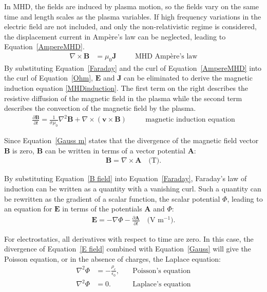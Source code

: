 In \ac{MHD}, the fields are induced by plasma motion, so the fields vary on the same time and length scales as the plasma variables. If high frequency variations in the electric field are not included, and only the non-relativistic regime is considered, the displacement current in Amp\`{e}re's law can be neglected, leading to Equation~\ref{AmpereMHD}.
\begin{align}
 \nabla\times\mathbf{B}&=\mu_0\mathbf{J}&&\quad\text{MHD Amp\`{e}re's law}
 \label{AmpereMHD}
\end{align}
\indent By substituting Equation~\ref{Faraday} and the curl of Equation~\ref{AmpereMHD} into the curl of Equation~\ref{Ohm}, $\mathbf{E}$ and $\mathbf{J}$ can be eliminated to derive the magnetic induction equation \eqref{MHDinduction}. The first term on the right describes the resistive diffusion of the magnetic field in the plasma while the second term describes the convection of the magnetic field by the plasma.
\begin{align}
 \frac{\partial\mathbf{B}}{\partial t}=\frac{1}{\sigma\mu_0}\nabla^2\mathbf{B}+\nabla\times\left(\mathbf{v}\times\mathbf{B}\right)&&\quad\text{magnetic induction equation}
 \label{MHDinduction}
\end{align}

Since Equation~\ref{Gauss m} states that the divergence of the magnetic field vector $\mathbf{B}$ is zero, $\mathbf{B}$ can be written in terms of a vector potential $\mathbf{A}$:
\begin{align}
 \mathbf{B}=\nabla\times\mathbf{A}\quad\text{(T)}.
 \label{B field}
\end{align}

By substituting Equation~\ref{B field} into Equation~\ref{Faraday}, Faraday's law of induction can be written as a quantity with a vanishing curl. Such a quantity can be rewritten as the gradient of a scalar function, the scalar potential $\Phi$, leading to an equation for $\mathbf{E}$ in terms of the potentials $\mathbf{A}$ and $\Phi$:
\begin{align}
 \mathbf{E}=-\nabla\Phi-\frac{\partial\mathbf{A}}{\partial t}\quad\text{(V m$^{-1}$)}.
 \label{E field}
\end{align}

For electrostatics, all derivatives with respect to time are zero. In this case, the divergence of Equation~\ref{E field} combined with Equation~\ref{Gauss} will give the Poisson equation, or in the absence of charges, the Laplace equation:
\begin{align}
 \nabla^2\Phi &= -\frac{\rho_e}{\epsilon_0},&\quad\text{Poisson's equation}
 \label{Poisson}\\
 \nabla^2\Phi &= 0.&\quad\text{Laplace's equation}
 \label{Laplace}
\end{align}


